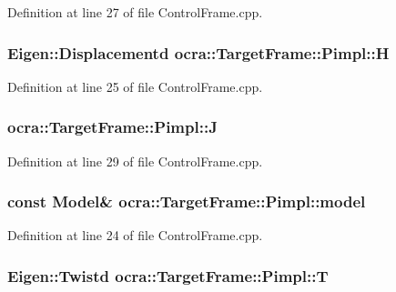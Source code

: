 Definition at line 27 of file Control\+Frame.\+cpp.

\subsubsection[{\texorpdfstring{H}{H}}]{\setlength{\rightskip}{0pt plus 5cm}Eigen\+::\+Displacementd ocra\+::\+Target\+Frame\+::\+Pimpl\+::H}\hypertarget{structocra_1_1TargetFrame_1_1Pimpl_a84a376863b43fa29115be56fa326d8df}{}\label{structocra_1_1TargetFrame_1_1Pimpl_a84a376863b43fa29115be56fa326d8df}


Definition at line 25 of file Control\+Frame.\+cpp.

\subsubsection[{\texorpdfstring{J}{J}}]{ ocra\+::\+Target\+Frame\+::\+Pimpl\+::J}\hypertarget{structocra_1_1TargetFrame_1_1Pimpl_afc2a059aca6dc89c5da22b1b86b36922}{}\label{structocra_1_1TargetFrame_1_1Pimpl_afc2a059aca6dc89c5da22b1b86b36922}


Definition at line 29 of file Control\+Frame.\+cpp.

\subsubsection[{\texorpdfstring{model}{model}}]{\setlength{\rightskip}{0pt plus 5cm}const {\bf Model}\& ocra\+::\+Target\+Frame\+::\+Pimpl\+::model}\hypertarget{structocra_1_1TargetFrame_1_1Pimpl_a7edc0b09f919bb223a44001cdba8dc84}{}\label{structocra_1_1TargetFrame_1_1Pimpl_a7edc0b09f919bb223a44001cdba8dc84}


Definition at line 24 of file Control\+Frame.\+cpp.

\subsubsection[{\texorpdfstring{T}{T}}]{\setlength{\rightskip}{0pt plus 5cm}Eigen\+::\+Twistd ocra\+::\+Target\+Frame\+::\+Pimpl\+::T}\hypertarget{structocra_1_1TargetFrame_1_1Pimpl_aecb4d2e7692ee0ff9298e8802756e098}{}\label{structocra_1_1TargetFrame_1_1Pimpl_aecb4d2e7692ee0ff9298e8802756e098}


